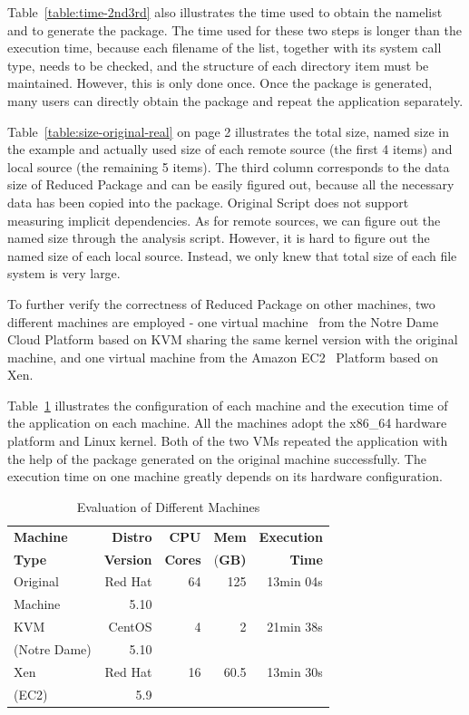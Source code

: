 \documentclass{sig-alternate}
\begin{document}
Table~\ref{table:time-2nd3rd} also illustrates the time used to
obtain the namelist and to generate the package. 
The time used for these two steps is longer than the execution time,
because each filename of the list, together with its system call type, needs to be checked, and the structure of each directory item must be maintained.
However, 
this is only done once.
Once the package is
generated, many users can directly obtain the package and repeat the application 
separately. 

Table~\ref{table:size-original-real} on page 2 illustrates the total size, named size in the example and actually used size of each remote source (the first 4 items) and local source (the remaining 5 items).
The third column corresponds to the data size of Reduced Package and can be easily figured out, because all the necessary data has been copied into the package.
Original Script does not support measuring implicit dependencies. As for remote sources, we can figure out the named size through the analysis script. However, it is hard to figure out the named size of each local source. 
Instead, we only knew that total size of each file system is very large.

To further verify the correctness of Reduced Package on other machines, two different machines are employed -
one virtual
machine~\cite{goldberg1974survey} from the Notre Dame Cloud Platform based on KVM sharing the same kernel version with the original machine,
and one virtual machine from  the Amazon EC2~\cite{amazon2010amazon} Platform based on Xen.

Table~\ref{table:config-vm} illustrates the configuration of 
each machine and the execution time of the application on each machine.
All the machines adopt the x86\_64 hardware platform and Linux kernel.
Both of the two VMs repeated the application with the help of the package generated on the original machine successfully.
The execution time on one machine greatly depends on its hardware configuration.

\begin{table}
    \centering
    \begin{tabular}{|l|r|r|r|r|}
    \hline
    \bf Machine & \bf Distro & \bf CPU & \bf Mem & \bf Execution\\ 
    \bf Type   &\bf Version&\bf Cores & (\bf GB) & \bf Time\\ \hline
    Original &  Red Hat  & 64 & 125 & 13min 04s\\  
    Machine& 5.10 &&&\\ \hline
    KVM & CentOS & 4 & 2 & 21min 38s\\
    (Notre Dame)&5.10 &&&\\ \hline
    Xen & Red Hat & 16 & 60.5 & 13min 30s\\ 
    (EC2) &5.9 &&&\\ \hline
    \end{tabular}
    \caption{Evaluation of Different Machines}
    \label{table:config-vm}
\end{table}
\end{document}
